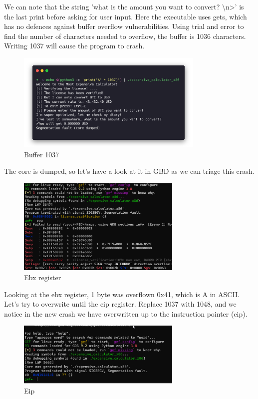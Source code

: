 We can note that the string 'what is the amount you want to convert?
\textbackslash n>' is the last print before asking for user input. Here the
executable uses gets, which has no defences against buffer overflow
vulnerabilities. Using trial and error to find the number of characters needed
to overflow, the buffer is 1036 characters. Writing 1037 will cause the program
to crash.

\begin{figure}[H]
  \centering
  \includegraphics[width=0.8\textwidth]{figures/echo-python}
  \caption{Buffer 1037}
  \label{f:echo-python}
\end{figure}

The core is dumped, so let's have a look at it in GBD as we can triage this
crash.

\begin{figure}[H]
  \centering
  \includegraphics[width=0.7\textwidth]{figures/gdb1}
  \caption{Ebx register}
  \label{f:gdb1}
\end{figure}

Looking at the ebx register, 1 byte was overflown 0x41, which is A in ASCII\@.
Let's try to overwrite until the eip register. Replace 1037 with 1048, and we
notice in the new crash we have overwritten up to the instruction pointer (eip).

\begin{figure}[H]
  \centering
  \includegraphics[width=0.7\textwidth]{figures/gdb2}
  \caption{Eip}
  \label{f:gdb2}
\end{figure}

